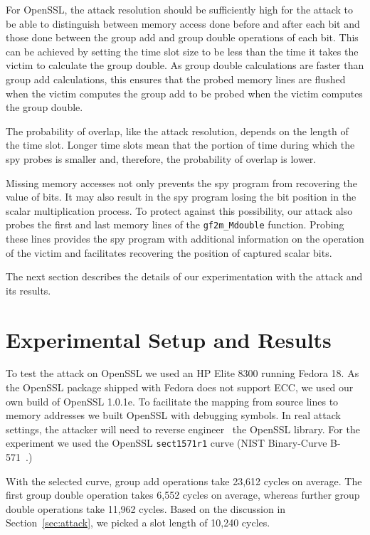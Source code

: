 \documentclass[twocolumn]{svjour3}
\begin{document}
For OpenSSL, the attack resolution should be sufficiently high for the attack to be able to distinguish between 
memory access done before and after each bit and those done between the group add and group double operations of each bit.
This can be achieved by setting the time slot size to be less than the time it takes the victim to calculate the group double.
As group double calculations are faster than group add calculations, this ensures that the probed memory lines are flushed
when the victim computes the group add to be probed when the victim computes the group double.

The probability of overlap, like the attack resolution, depends on the length of the time slot.
Longer time slots mean that the portion of time during which the spy probes is smaller and, therefore, 
the probability of overlap is lower.

Missing memory accesses not only prevents the spy program from recovering the value of bits.
It may also result in the spy program losing the bit position in the scalar multiplication process.
To protect against this possibility, our attack also probes the first and last memory lines of the 
\texttt{gf2m\_Mdouble} function.
Probing these lines provides the spy program with additional information on the operation of the victim
and facilitates recovering the position of captured scalar bits.


The next section describes the details of our experimentation with the attack and its results.


\section{Experimental Setup and Results}\label{sec:results}

To test the attack on OpenSSL we used an HP Elite 8300 
running Fedora 18.
As the OpenSSL package shipped with Fedora does not support ECC,
we used our own build of OpenSSL 1.0.1e. 
To facilitate the mapping from source lines to memory addresses we built OpenSSL with debugging symbols.
In real attack settings, the attacker will need to reverse engineer~\cite{cipsero10software}
the OpenSSL library.
For the experiment we used the OpenSSL \texttt{sect1571r1} curve (NIST Binary-Curve B-571~\cite{fips}.)

With the selected curve, group add operations take 23,612 cycles on average.
The first group double operation takes 6,552 cycles on average, whereas further group double operations take 11,962 cycles.
Based on the discussion in Section~\ref{sec:attack}, we picked a slot length of 10,240 cycles.
\end{document}
